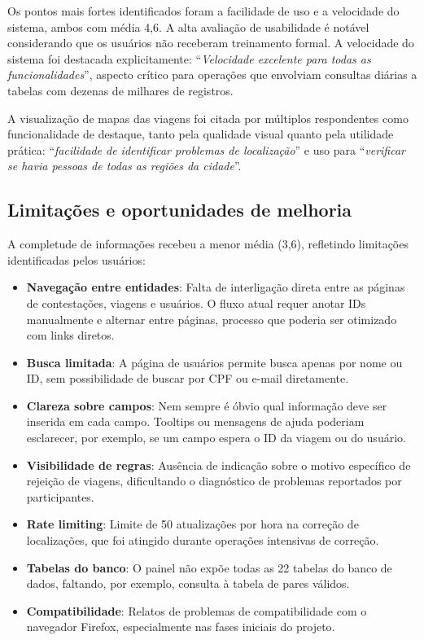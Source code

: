 Os pontos mais fortes identificados foram a facilidade de uso e a velocidade do sistema, ambos com média 4,6. A alta avaliação de usabilidade é notável considerando que os usuários não receberam treinamento formal. A velocidade do sistema foi destacada explicitamente: ``\textit{Velocidade excelente para todas as funcionalidades}'', aspecto crítico para operações que envolviam consultas diárias a tabelas com dezenas de milhares de registros.

A visualização de mapas das viagens foi citada por múltiplos respondentes como funcionalidade de destaque, tanto pela qualidade visual quanto pela utilidade prática: ``\textit{facilidade de identificar problemas de localização}'' e uso para ``\textit{verificar se havia pessoas de todas as regiões da cidade}''.

\subsection{Limitações e oportunidades de melhoria}

A completude de informações recebeu a menor média (3,6), refletindo limitações identificadas pelos usuários:

\begin{itemize}
  \item \textbf{Navegação entre entidades}: Falta de interligação direta entre as páginas de contestações, viagens e usuários. O fluxo atual requer anotar IDs manualmente e alternar entre páginas, processo que poderia ser otimizado com links diretos.
  \item \textbf{Busca limitada}: A página de usuários permite busca apenas por nome ou ID, sem possibilidade de buscar por CPF ou e-mail diretamente.
  \item \textbf{Clareza sobre campos}: Nem sempre é óbvio qual informação deve ser inserida em cada campo. Tooltips ou mensagens de ajuda poderiam esclarecer, por exemplo, se um campo espera o ID da viagem ou do usuário.
  \item \textbf{Visibilidade de regras}: Ausência de indicação sobre o motivo específico de rejeição de viagens, dificultando o diagnóstico de problemas reportados por participantes.
  \item \textbf{Rate limiting}: Limite de 50 atualizações por hora na correção de localizações, que foi atingido durante operações intensivas de correção.
  \item \textbf{Tabelas do banco}: O painel não expõe todas as 22 tabelas do banco de dados, faltando, por exemplo, consulta à tabela de pares válidos.
  \item \textbf{Compatibilidade}: Relatos de problemas de compatibilidade com o navegador Firefox, especialmente nas fases iniciais do projeto.
\end{itemize}

